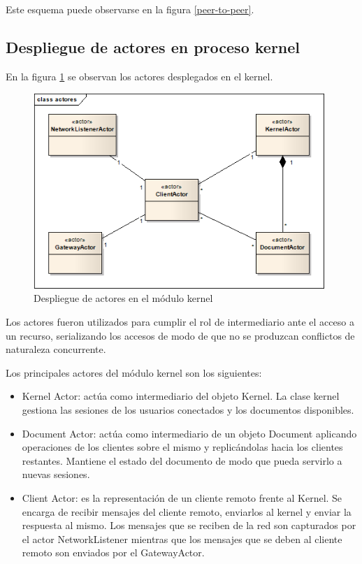 \documentclass[12pt,a4paper]{article}
\begin{document}
Este esquema puede observarse en la figura \ref{peer-to-peer}.

\subsection{Despliegue de actores en proceso kernel}

En la figura \ref{actores-kernel} se observan los actores desplegados en el kernel.

	\begin{figure}[!ht]
		\begin{center}
			\includegraphics[width=11cm]{actores-kernel.png}
			\caption{\label{actores-kernel} Despliegue de actores en el módulo kernel }
		\end{center}
	\end{figure}

Los actores fueron utilizados para cumplir el rol de intermediario ante el acceso a un recurso, serializando los accesos de
modo de que no se produzcan conflictos de naturaleza concurrente.

Los principales actores del módulo kernel son los siguientes:
\begin{itemize}
	\item Kernel Actor: actúa como intermediario del objeto Kernel. La clase kernel gestiona las sesiones de los usuarios
	conectados y los documentos disponibles.
	\item Document Actor: actúa como intermediario de un objeto Document aplicando operaciones de los clientes sobre el mismo
	y replicándolas hacia los clientes restantes. Mantiene el estado del documento de modo que pueda servirlo a nuevas sesiones.
	\item Client Actor: es la representación de un cliente remoto frente al Kernel. Se encarga de recibir mensajes del
	cliente remoto, enviarlos al kernel y enviar la respuesta al mismo. Los mensajes que se reciben de la red son capturados por
	el actor NetworkListener mientras que los mensajes que se deben al cliente remoto son enviados por el GatewayActor.
\end{itemize}
\end{document}
